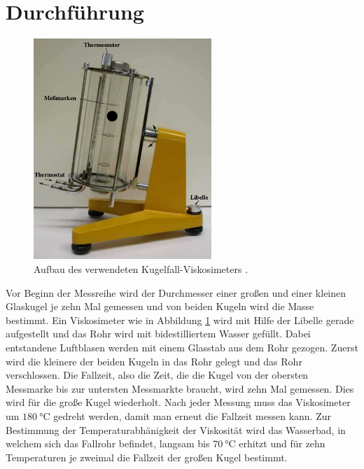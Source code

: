 \section{Durchführung}
\label{sec:Durchführung}
\begin{figure}
  \centering
  \includegraphics[width=0.6\textwidth]{viskosimeter.png}
  \caption{Aufbau des verwendeten Kugelfall-Viskosimeters \cite{sample}.}
  \label{fig:viskosimeter}
\end{figure}
Vor Beginn der Messreihe wird der Durchmesser einer großen und einer kleinen
Glaskugel je zehn Mal gemessen und von beiden Kugeln wird die Masse bestimmt.
Ein Viskosimeter wie in Abbildung \ref{fig:viskosimeter} wird mit Hilfe der
Libelle gerade aufgestellt und das Rohr wird mit bidestilliertem Wasser gefüllt.
Dabei entstandene Luftblasen werden mit einem Glasstab aus dem Rohr gezogen.
Zuerst wird die kleinere der beiden Kugeln in das Rohr gelegt und das Rohr
verschlossen. Die Fallzeit, also die Zeit, die die Kugel von der obersten Messmarke
bis zur untersten Messmarkte braucht, wird zehn Mal gemessen. Dies wird für die
große Kugel wiederholt. Nach jeder Messung muss das Viskosimeter um $\SI{180}
{\celsius}$ gedreht werden, damit man erneut die Fallzeit messen kann.\newline
Zur Bestimmung der Temperaturabhänigkeit der Viskosität wird das Wasserbad, in
welchem sich das Fallrohr befindet, langsam bis $\SI{70}{\celsius}$ erhitzt
und für zehn Temperaturen je zweimal die Fallzeit der großen Kugel bestimmt.
